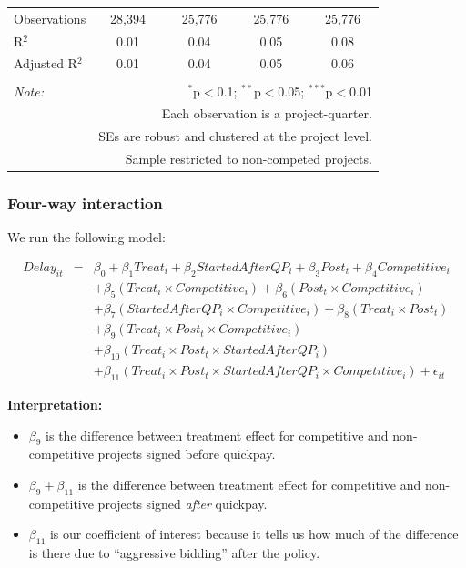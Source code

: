 \documentclass[
]{article}
\providecommand{\tightlist}{%
  \setlength{\itemsep}{0pt}\setlength{\parskip}{0pt}}
\begin{document}
\begin{table}[H]
\begin{tabular}{@{\extracolsep{-2pt}}lcccc}
Observations & 28,394 & 25,776 & 25,776 & 25,776 \\ 
R$^{2}$ & 0.01 & 0.04 & 0.05 & 0.08 \\ 
Adjusted R$^{2}$ & 0.01 & 0.04 & 0.05 & 0.06 \\ 
\hline 
\hline \\[-1.8ex] 
\textit{Note:}  & \multicolumn{4}{r}{$^{*}$p$<$0.1; $^{**}$p$<$0.05; $^{***}$p$<$0.01} \\ 
 & \multicolumn{4}{r}{Each observation is a project-quarter.} \\ 
 & \multicolumn{4}{r}{SEs are robust and clustered at the project level.} \\ 
 & \multicolumn{4}{r}{Sample restricted to non-competed projects.} \\ 
\end{tabular} 
\end{table}

\hypertarget{four-way-interaction}{%
\subsubsection{Four-way interaction}\label{four-way-interaction}}

We run the following model:

\[\begin{aligned} Delay_{it} &=& \beta_0 +\beta_1 Treat_i+ \beta_2 StartedAfterQP_i+ \beta_3 Post_t+ \beta_4 Competitive_i\\ && +  \beta_5 (Treat_i \times Competitive_i) + \beta_6 (Post_t \times Competitive_i)\\ && +  \beta_7 (StartedAfterQP_i \times Competitive_i) +\beta_8 (Treat_i \times Post_t)\\ && + \beta_9 (Treat_i \times Post_t \times Competitive_i) \\ && + \beta_{10} (Treat_i \times Post_t \times StartedAfterQP_i )\\ && + \beta_{11} (Treat_i \times Post_t \times StartedAfterQP_i \times Competitive_i) + \epsilon_{it} \end{aligned}\]

\textbf{Interpretation:}

\begin{itemize}
\tightlist
\item
  \(\beta_9\) is the difference between treatment effect for competitive
  and non-competitive projects signed before quickpay.
\item
  \(\beta_9 + \beta_{11}\) is the difference between treatment effect
  for competitive and non-competitive projects signed \emph{after}
  quickpay.
\item
  \(\beta_{11}\) is our coefficient of interest because it tells us how
  much of the difference is there due to ``aggressive bidding'' after
  the policy.
\end{itemize}
\end{document}
